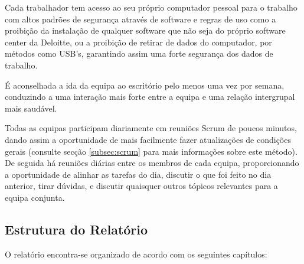         Cada trabalhador tem acesso ao seu próprio computador pessoal para o trabalho com altos padrões de segurança através de software e regras de uso como a proibição da instalação de qualquer software que não seja do próprio software center da Deloitte, ou a proibição de retirar de dados do computador, por métodos como USB's, garantindo assim uma forte segurança dos dados de trabalho.
        
        É aconselhada a ida da equipa ao escritório pelo menos uma vez por semana, conduzindo a uma interação mais forte entre a equipa e uma relação intergrupal mais saudável.
        
        Todas as equipas participam diariamente em reuniões Scrum de poucos minutos, dando assim a oportunidade de mais facilmente fazer atualizações de condições gerais (consulte secção \ref{subsec:scrum} para mais informações sobre este método). De seguida há reuniões diárias entre os membros de cada equipa, proporcionando a oportunidade de alinhar as tarefas do dia, discutir o que foi feito no dia anterior, tirar dúvidas, e discutir quaisquer outros tópicos relevantes para a equipa conjunta. 

    
    \subsection{Estrutura do Relatório}\label{subsec:estrutura-relatorio}

        O relatório encontra-se organizado de acordo com os seguintes capítulos:

